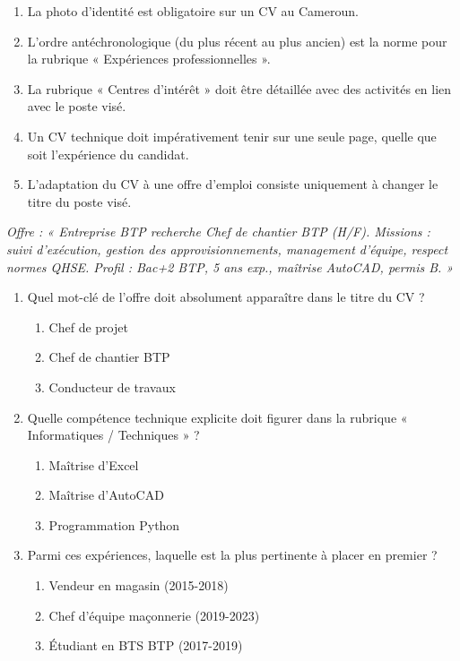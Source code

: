 \documentclass[11pt]{article}
\begin{document}
\begin{exercice}
\begin{enumerate}
    \item La photo d'identité est obligatoire sur un CV au Cameroun.
    \item L'ordre antéchronologique (du plus récent au plus ancien) est la norme pour la rubrique « Expériences professionnelles ».
    \item La rubrique « Centres d'intérêt » doit être détaillée avec des activités en lien avec le poste visé.
    \item Un CV technique doit impérativement tenir sur une seule page, quelle que soit l'expérience du candidat.
    \item L'adaptation du CV à une offre d'emploi consiste uniquement à changer le titre du poste visé.
\end{enumerate}
\end{exercice}

\begin{exercice}
\textit{Offre : « Entreprise BTP recherche Chef de chantier BTP (H/F). Missions : suivi d'exécution, gestion des approvisionnements, management d'équipe, respect normes QHSE. Profil : Bac+2 BTP, 5 ans exp., maîtrise AutoCAD, permis B. »}

\begin{enumerate}
    \item Quel mot-clé de l'offre doit absolument apparaître dans le titre du CV ?
    \begin{enumerate}
        \item Chef de projet
        \item Chef de chantier BTP
        \item Conducteur de travaux
    \end{enumerate}
    \item Quelle compétence technique explicite doit figurer dans la rubrique « Informatiques / Techniques » ?
    \begin{enumerate}
        \item Maîtrise d'Excel
        \item Maîtrise d'AutoCAD
        \item Programmation Python
    \end{enumerate}
    \item Parmi ces expériences, laquelle est la plus pertinente à placer en premier ?
    \begin{enumerate}
        \item Vendeur en magasin (2015-2018)
        \item Chef d'équipe maçonnerie (2019-2023)
        \item Étudiant en BTS BTP (2017-2019)
    \end{enumerate}
\end{enumerate}
\end{exercice}
\end{document}
